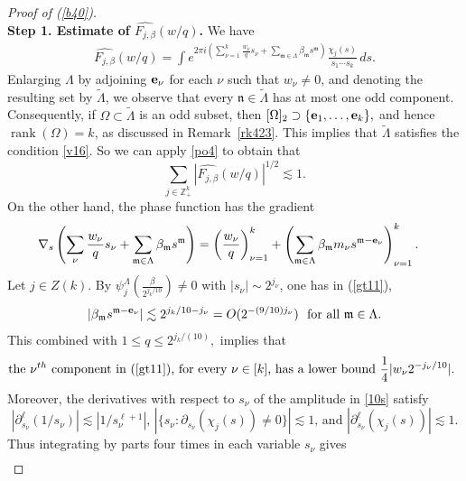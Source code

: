 \documentclass[11 pt,letterpaper]{amsart}
\theoremstyle{plain}
\theoremstyle{definition}
\theoremstyle{remark} \theoremstyle{exam} \theoremstyle{ob}
\numberwithin{equation}{section}
\begin{document}
\begin{proof}[Proof of  (\ref{b40})]
\\
\textbf{Step 1. Estimate of $\widehat{F_{j,\beta}}(w/q)$.}
We have
\begin{align}\label{10s}
\widehat{F_{j,\beta}}(w/q)
=
\int 
e^{2\pi i\left(\sum_{\nu=1}^k \frac{w_\nu}{q}s_\nu + \sum_{\mathfrak m\in\Lambda}\beta_{\mathfrak m}s^{\mathfrak m}\right)}
\frac{\chi_j(s)}{s_1\cdots s_k}\,ds.
\end{align}
Enlarging $\Lambda$ by adjoining ${\bf e}_\nu$ for each $\nu$ such that $w_\nu\neq0$, and denoting the resulting set by $\widetilde\Lambda$, we observe that every $\mathfrak n\in\widetilde\Lambda$ has at most one odd component. 
Consequently, if $\Omega\subset\widetilde\Lambda$ is an odd subset, then
$[\Omega]_2\supset\{ {\bf e}_1,\ldots,{\bf e}_k\},$ and hence $\operatorname{rank}(\Omega)=k$, as discussed in Remark~\ref{rk423}.
This implies that $\tilde{\Lambda}$ satisfies the condition \eqref{v16}. So we can apply \eqref{po4} to obtain that
\begin{equation}\label{kp2}
\sum_{j\in\mathbb{Z}_+^k}
|\widehat{F_{j,\beta}}(w/q)|^{1/2}
\lesssim 1.
\end{equation}
On the other hand, the phase function has the gradient 
\begin{align}\label{gt11}
&\nabla_s \left(\sum_{\nu}\frac{w_\nu}{q}  s_\nu +\sum_{\mathfrak{m}\in \Lambda}  \beta_{\mathfrak{m}} s^{\mathfrak{m}}\right)=\left(\frac{ w_\nu }{q}\right)_{\nu=1}^k+\left(\sum_{\mathfrak{m}\in \Lambda}  \beta_{\mathfrak{m}}m_\nu s^{\mathfrak{m}-{\bf e}_{\nu}}\right)_{\nu=1}^k.
\end{align}
Let $j\in Z(k)$.  By $ \psi_j^{\Lambda}\left( \frac{\beta}{2^{j_{k}/10}} \right)\ne 0$ with $|s_\nu|\sim 2^{j_\nu}$, one has in (\ref{gt11}),
\begin{align*}
|\beta_{\mathfrak{m}}   s^{\mathfrak{m}-{\bf e}_{\nu}}|\lesssim 2^{j_k /10-j_\nu}=O(2^{-(9/10)j_\nu})\ \text{   for all $\mathfrak{m}\in \Lambda$.}
\end{align*}
 This combined with $1\le q\le 2^{j_k/(10)}, $  implies that  
$$\text{the $\nu^{th}$ component in (\ref{gt11}),  for every  $\nu\in [k]$, has a lower bound $\frac{1}{4}|w_\nu 2^{- j_\nu/10}|$.
}$$
Moreover,  the derivatives with respect to $s_\nu$ of the amplitude in \eqref{10s} satisfy $$
\text{$|\partial^{\ell}_{s_\nu}(1/s_\nu)|\lesssim |1/s_\nu^{\ell+1}|$, $|\{s_\nu:\partial_{s_\nu}(  \chi_j(s) )\ne 0\}|\lesssim 1$, and $|\partial^\ell_{s_\nu}(  \chi_j(s) )|\lesssim 1$.}$$
Thus integrating by parts four times in each variable $s_\nu$ gives 
\begin{align*}

\end{align*}
\end{proof}
\end{document}
